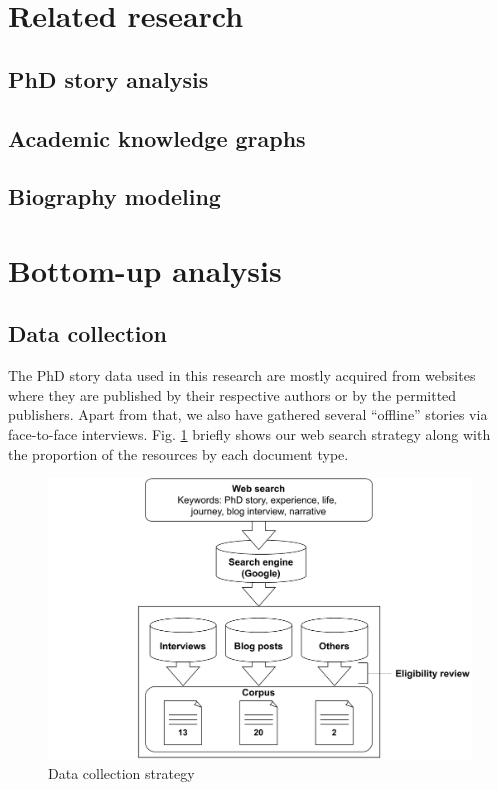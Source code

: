 \documentclass{kerauth}
\begin{document}
\section{Related research}
\label{s:related}

\subsection{PhD story analysis}
\subsection{Academic knowledge graphs}
\subsection{Biography modeling}

\section{Bottom-up analysis}
\label{s:data-bottom}
\subsection{Data collection}
The PhD story data used in this research are mostly acquired from websites where they are published by their respective authors or by the permitted publishers. Apart from that, we also have gathered several ``offline'' stories via face-to-face interviews. Fig. \ref{fig:data-collection} briefly shows our web search strategy along with the proportion of the resources by each document type.

\begin{figure}[ht]
  \centering
  \includegraphics[width=13cm]{figures/data-collection.drawio.pdf}
  \caption[data-collection]{Data collection strategy}%
  \label{fig:data-collection}
\end{figure}
\end{document}
